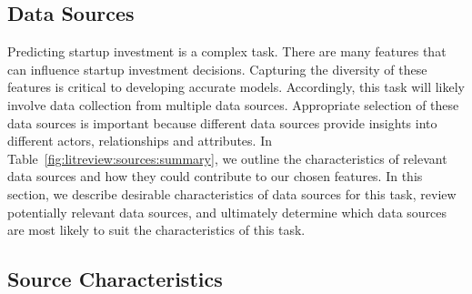 \documentclass[../thesis/thesis.tex]{subfiles}
\begin{document}
\begin{refsection}
\section{Data Sources}
\label{sec:litreview:sources}

Predicting startup investment is a complex task. There are many features that can influence startup investment decisions. Capturing the diversity of these features is critical to developing accurate models. Accordingly, this task will likely involve data collection from multiple data sources. Appropriate selection of these data sources is important because different data sources provide insights into different actors, relationships and attributes. In Table~\ref{fig:litreview:sources:summary}, we outline the characteristics of relevant data sources and how they could contribute to our chosen features. In this section, we describe desirable characteristics of data sources for this task, review potentially relevant data sources, and ultimately determine which data sources are most likely to suit the characteristics of this task.


\subsection{Source Characteristics}


\end{refsection}
\end{document}
